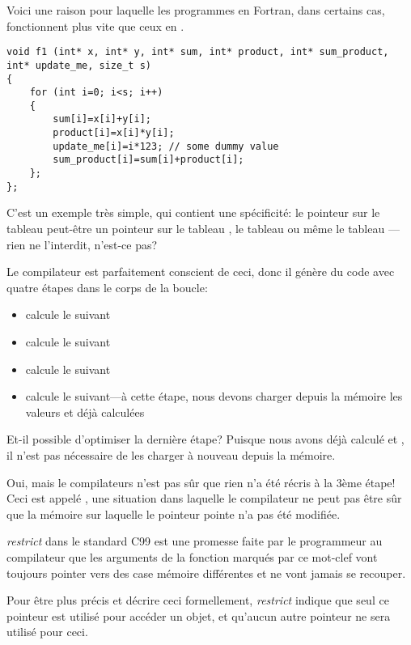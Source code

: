 
Voici une raison pour laquelle les programmes en Fortran, dans certains cas, fonctionnent
plus vite que ceux en \CCpp.

\begin{lstlisting}[style=customc]
void f1 (int* x, int* y, int* sum, int* product, int* sum_product, int* update_me, size_t s)
{
	for (int i=0; i<s; i++)
	{
		sum[i]=x[i]+y[i];
		product[i]=x[i]*y[i];
		update_me[i]=i*123; // some dummy value
		sum_product[i]=sum[i]+product[i];	
	};
};
\end{lstlisting}

C'est un exemple très simple, qui contient une spécificité:
le pointeur sur le tableau  peut-être un pointeur sur le tableau
, le tableau  ou même le tableau ---rien
ne l'interdit, n'est-ce pas?

Le compilateur est parfaitement conscient de ceci, donc il génère du code avec quatre
étapes dans le corps de la boucle:
\begin{itemize}
\item calcule le  suivant
\item calcule le  suivant
\item calcule le  suivant
\item calcule le  suivant---à cette étape, nous devons charger
depuis la mémoire les valeurs  et  déjà calculées
\end{itemize}

Et-il possible d'optimiser la dernière étape?
Puisque nous avons déjà calculé  et , il n'est pas nécessaire
de les charger à nouveau depuis la mémoire.

Oui, mais le compilateurs n'est pas sûr que rien n'a été récris à la 3ème étape!
Ceci est appelé ,
une situation dans laquelle le compilateur ne peut pas être sûr que la mémoire sur
laquelle le pointeur pointe n'a pas été modifiée.

\emph{restrict} dans le standard C99 
est une promesse faite par le programmeur au compilateur que les arguments de la
fonction marqués par ce mot-clef vont toujours pointer vers des case mémoire différentes
et ne vont jamais se recouper.

Pour être plus précis et décrire ceci formellement, \emph{restrict} indique que seul
ce pointeur est utilisé pour accéder un objet, et qu'aucun autre pointeur ne sera
utilisé pour ceci.

